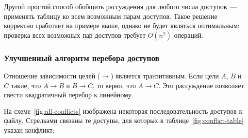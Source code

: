 Другой простой способ обобщить рассуждения для любого числа доступов~--- применять таблицу ко всем возможным парам доступов. Такое решение корректно сработает на примере выше, однако не будет являться оптимальным: проверка всех возможных пар доступов требует $O(n^2)$ операций.

\subsubsection{Улучшенный алгоритм перебора доступов}
\label{subsubsec:linear-time-proof}

Отношение зависимости целей ($\rightarrow$) является транзитивным. Если цели $A$, $B$ и $C$ такие, что $A \rightarrow B$ и $B \rightarrow C$, то верно, что $A \rightarrow C$. Это рассуждение позволяет свести квадратичный перебор к линейному.

На схеме~\ref{fig:all-conflicts} изображена некоторая последовательность доступов к файлу. Стрелками связаны те доступы, для которых в таблице~\ref{fig:conflict-table} указан конфликт:

